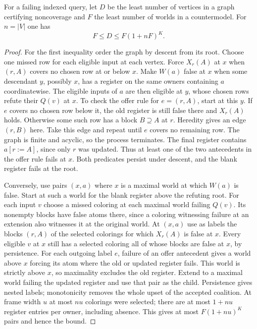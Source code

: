 \begin{proposition}
\label{core:prop:guard-dag-countermodel}
For a failing indexed query, let $D$ be the least number
of vertices in a graph certifying noncoverage and $F$ the least number
of worlds in a countermodel. For $n=|V|$ one has
\[
                         F\le D\le F(1+nF)^K .
\]
\end{proposition}
\begin{proof}
For the first inequality order the graph by descent from its root.
Choose one missed row for each eligible input at each vertex.
Force $X_r(A)$ at $x$ when $(r,A)$ covers no chosen row at or below
$x$. Make $W(a)$ false at $x$ when some descendant $y$, possibly
$x$, has a register on the same owners containing $a$ coordinatewise.
The eligible inputs of $a$ are then eligible at $y$, whose chosen
rows refute their $Q(v)$ at $x$. To check the offer rule for
$e=(r,A)$, start at this $y$. If $e$ covers no chosen row below it,
the old register is still false there and $X_r(A)$ holds.
Otherwise some such row has a block $B\supseteq A$ at $r$.
Heredity gives an edge $(r,B)$ here. Take this edge and repeat until
$e$ covers no remaining row. The graph is finite and acyclic, so the
process terminates. The final register contains $a[r:=A]$, since
only $r$ was updated. Thus at least one of the two antecedents in
the offer rule fails at $x$. Both predicates persist under descent,
and the blank register fails at the root.

Conversely, use pairs $(x,a)$ where $x$ is a maximal world at
which $W(a)$ is false. Start at such a world for the blank register
above the refuting root. For each input $v$
choose a missed coloring at each maximal world failing $Q(v)$.
Its nonempty blocks have false atoms there, since a coloring
witnessing failure at an extension also witnesses it at the original
world. At $(x,a)$ use as labels the blocks $(r,A)$ of the selected colorings
for which $X_r(A)$ is false at $x$.
Every eligible $v$ at $x$ still has a selected coloring all of whose
blocks are false at $x$, by persistence. For each outgoing label $e$, failure of an
offer antecedent
gives a world above $x$ forcing its atom where the old or updated
register fails. This world is strictly above $x$, so maximality
excludes the old register. Extend to a maximal world failing the
updated register and use that pair as the child. Persistence gives
nested labels; monotonicity removes the whole upset of the accepted
coalition. At frame width $u$ at most $nu$ colorings were selected;
there are at most $1+nu$ register entries per owner, including absence.
This gives at most $F(1+nu)^K$ pairs and hence the bound.
\end{proof}

